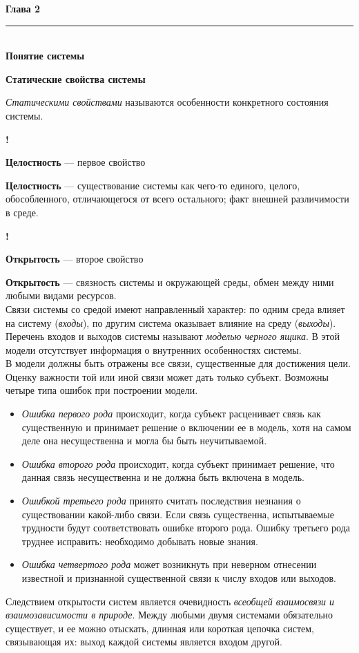 \documentclass{article}
\newcommand{\note}[1]{\textit{#1}}
\renewcommand{\section}[2]{
	\vspace{6em}
	\begin{flushright}
	\Large
	\baselineskip=0.5\baselineskip
	\textbf{#1}
	\\
	\rule[0.5\baselineskip]{\textwidth}{0.15pt}
	\\
	\textbf{#2}
	\end{flushright}
	}
\renewcommand{\subsection}[1]{
	\vspace{2em}
	\begin{flushright}
		\large
		\textbf{#1}
	\end{flushright}
	}
\newcommand{\define}[2]{
	\textbf{#1} --- #2
	}
\newcommand{\marked}[2]{
	\begin{flushright}\textbf{!}\hspace{2ex}\vline\hspace{2ex}
		\begin{minipage}{0.9\textwidth}
			\define{#1}{#2}
		\end{minipage}
	\end{flushright}
	}
\begin{document}
\section{Глава 2}{Понятие системы}
\subsection{Статические свойства системы}
\note{Статическими свойствами} называются особенности конкретного состояния системы.
\marked{Целостность}{первое свойство}
\define{Целостность}{существование системы как чего-то единого, целого, обособленного, отличающегося от всего остального; факт внешней различимости в среде.}
\marked{Открытость}{второе свойство}
\define{Открытость}{связность системы и окружающей среды, обмен между ними любыми видами ресурсов.}\\
Связи системы со средой имеют направленный характер: по одним среда влияет на систему (\note{входы}), по другим система оказывает влияние на среду (\note{выходы}). Перечень входов и выходов системы называют \note{моделью черного ящика}. В этой модели отсутствует информация о внутренних особенностях системы.\\
В модели должны быть отражены все связи, существенные для достижения цели. Оценку важности той или иной связи может дать только субъект. Возможны четыре типа ошибок при построении модели.
\begin{itemize}
	\item \note{Ошибка первого рода} происходит, когда субъект расценивает связь как существенную и принимает решение о включении ее в модель, хотя на самом деле она несущественна и могла бы быть неучитываемой.
	\item \note{Ошибка второго рода} происходит, когда субъект принимает решение, что данная связь несущественна и не должна быть включена в модель.
	\item \note{Ошибкой третьего рода} принято считать последствия незнания о существовании какой-либо связи. Если связь существенна, испытываемые трудности будут соответствовать ошибке второго рода. Ошибку третьего рода труднее исправить: необходимо добывать новые знания.
	\item \note{Ошибка четвертого рода} может возникнуть при неверном отнесении известной и признанной существенной связи к числу входов или выходов. 
\end{itemize}
Следствием открытости систем является очевидность \note{всеобщей взаимосвязи и взаимозависимости в природе}. Между любыми двумя системами обязательно существует, и ее можно отыскать, длинная или короткая цепочка систем, связывающая их: выход каждой системы является входом другой.
\end{document}
